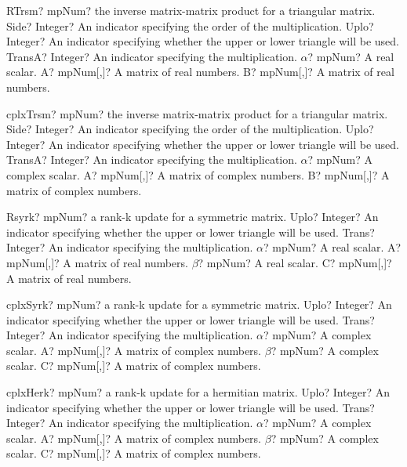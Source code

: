 \documentclass[12pt,a4paper,openany]{book}
\begin{document}
\begin{mpFunctionsExtract}
\mpFunctionSix
{RTrsm? mpNum? the inverse matrix-matrix product for a triangular matrix.}
{Side? Integer? An indicator specifying the order of the multiplication.}
{Uplo? Integer? An indicator specifying whether the upper or lower triangle will be used.}
{TransA? Integer? An indicator specifying the multiplication.}
{$\alpha$? mpNum? A real scalar.}
{A? mpNum[,]? A matrix of real numbers.}
{B? mpNum[,]? A matrix of real numbers.}
\end{mpFunctionsExtract}

\begin{mpFunctionsExtract}
\mpFunctionSix
{cplxTrsm? mpNum? the inverse matrix-matrix product for a triangular matrix.}
{Side? Integer? An indicator specifying the order of the multiplication.}
{Uplo? Integer? An indicator specifying whether the upper or lower triangle will be used.}
{TransA? Integer? An indicator specifying the multiplication.}
{$\alpha$? mpNum? A complex scalar.}
{A? mpNum[,]? A matrix of complex numbers.}
{B? mpNum[,]? A matrix of complex numbers.}
\end{mpFunctionsExtract}

\begin{mpFunctionsExtract}
\mpFunctionSix
{Rsyrk? mpNum? a rank-k update for a symmetric matrix.}
{Uplo? Integer? An indicator specifying whether the upper or lower triangle will be used.}
{Trans? Integer? An indicator specifying the multiplication.}
{$\alpha$? mpNum? A real scalar.}
{A? mpNum[,]? A matrix of real numbers.}
{$\beta$? mpNum? A real scalar.}
{C? mpNum[,]? A matrix of real numbers.}
\end{mpFunctionsExtract}

\begin{mpFunctionsExtract}
\mpFunctionSix
{cplxSyrk? mpNum? a rank-k update for a symmetric matrix.}
{Uplo? Integer? An indicator specifying whether the upper or lower triangle will be used.}
{Trans? Integer? An indicator specifying the multiplication.}
{$\alpha$? mpNum? A complex scalar.}
{A? mpNum[,]? A matrix of complex numbers.}
{$\beta$? mpNum? A complex scalar.}
{C? mpNum[,]? A matrix of complex numbers.}
\end{mpFunctionsExtract}

\begin{mpFunctionsExtract}
\mpFunctionSix
{cplxHerk? mpNum? a rank-k update for a hermitian matrix.}
{Uplo? Integer? An indicator specifying whether the upper or lower triangle will be used.}
{Trans? Integer? An indicator specifying the multiplication.}
{$\alpha$? mpNum? A complex scalar.}
{A? mpNum[,]? A matrix of complex numbers.}
{$\beta$? mpNum? A complex scalar.}
{C? mpNum[,]? A matrix of complex numbers.}
\end{mpFunctionsExtract}
\end{document}
